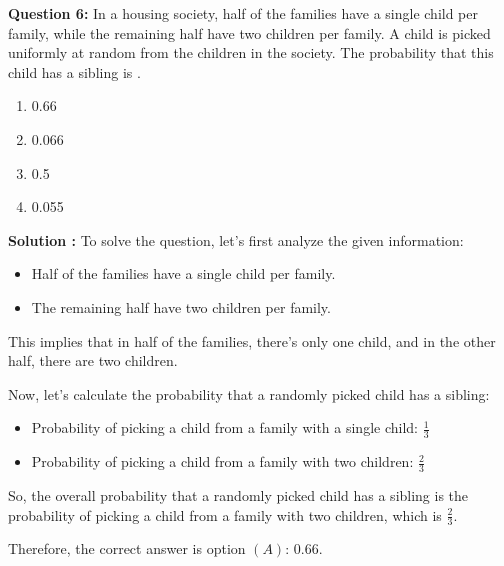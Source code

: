 \documentclass[10pt]{article}
\begin{document}
\textbf{Question 6:} In a housing society, half of the families have a single child per family, while the remaining half have two children per family. A child is picked uniformly at random from the children in the society. The probability that this child has a sibling is \underline{\hspace{2cm}}.
\begin{enumerate}[label =(\Alph*)]
\item 0.66
\item 0.066
\item 0.5
\item 0.055
\end{enumerate}

\textbf{Solution :} To solve the question, let's first analyze the given information:

\begin{itemize}
    \item Half of the families have a single child per family.
    \item The remaining half have two children per family.
\end{itemize}

This implies that in half of the families, there's only one child, and in the other half, there are two children.

Now, let's calculate the probability that a randomly picked child has a sibling:

\begin{itemize}
    \item Probability of picking a child from a family with a single child: \( \frac{1}{3} \)
    \item Probability of picking a child from a family with two children: \( \frac{2}{3} \)
\end{itemize}
So, the overall probability that a randomly picked child has a sibling is the probability of picking a child from a family with two children, which is \( \frac{2}{3} \).

Therefore, the correct answer is option $(A)$: \( 0.66 \).
\end{document}
